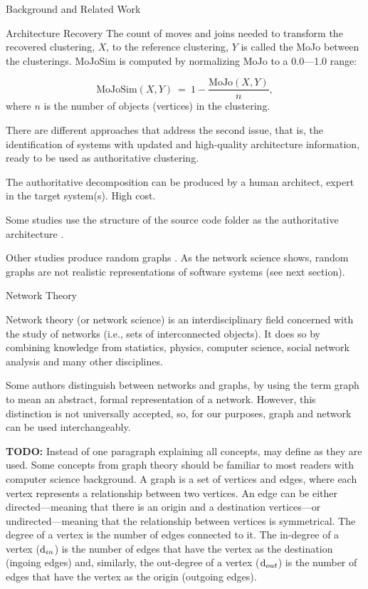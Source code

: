 \documentclass[11pt,twocolumn,a4paper,english]{article}
\newcommand{\TODO}{\textbf{TODO:} }
\begin{document}
\begin{section}{Background and Related Work}
\begin{subsection}{Architecture Recovery}
	The count of moves and joins needed to transform the recovered clustering, $X$, to the reference clustering, $Y$ is called the MoJo between the clusterings. MoJoSim is computed by normalizing MoJo to a 0.0---1.0 range:
	
	$$
	\mathrm{MoJoSim}(X, Y) ~=~ 1 - \frac{\mathrm{MoJo}(X, Y)}{n}\mathrm{,}
	$$
where $n$ is the number of objects (vertices) in the clustering.
	
	There are different approaches that address the second issue, that is, the identification of systems with updated and high-quality architecture information, ready to be used as authoritative clustering.
	
	The authoritative decomposition can be produced by a human architect, expert in the target system(s). High cost.
	
	Some studies use the structure of the source code folder as the authoritative architecture \cite{Bittencourt2009,Wu2005}.
	
	Other studies produce random graphs \cite{Mitchell2007}.  As the network science shows, random graphs are not realistic representations of software systems (see next section).
	
\end{subsection}

\begin{subsection}{Network Theory}
	
	Network theory (or network science) is an interdisciplinary field concerned with the study of networks (i.e., sets of interconnected objects). It does so by combining knowledge from statistics, physics, computer science, social network analysis and many other disciplines.

	Some authors distinguish between networks and graphs, by using the term graph to mean an abstract, formal representation of a network. However, this distinction is not universally accepted, so, for our purposes, graph and network can be used interchangeably.

	\TODO Instead of one paragraph explaining all concepts, may define as they are used.
	Some concepts from graph theory should be familiar to most readers with computer science background. A graph is a set of vertices and edges, where each vertex represents a relationship between two vertices. An edge can be either directed---meaning that there is an origin and a destination vertices---or undirected---meaning that the relationship between vertices is symmetrical. The degree of a vertex is the number of edges connected to it. 
The in-degree of a vertex ($\mathrm{d}_{in}$) is the number of edges that have the vertex as the destination (ingoing edges) and, similarly, the out-degree of a vertex ($\mathrm{d}_{out}$) is the number of edges that have the vertex as the origin (outgoing edges).


\end{subsection}
\end{section}
\end{document}
